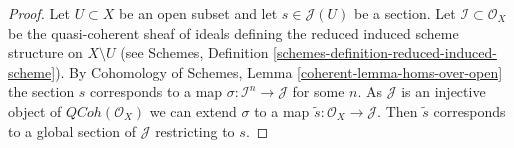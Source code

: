 \documentclass{stacks-project}
\theoremstyle{plain}
\theoremstyle{definition}
\theoremstyle{remark}
\numberwithin{equation}{subsection}
\def\QCoh{\mathit{QCoh}}
\begin{document}
\begin{proof}
Let $U \subset X$ be an open subset and let $s \in \mathcal{J}(U)$ be a section.
Let $\mathcal{I} \subset \mathcal{O}_X$ be the quasi-coherent sheaf
of ideals defining the reduced induced scheme structure on $X \setminus U$
(see Schemes, Definition \ref{schemes-definition-reduced-induced-scheme}).
By Cohomology of Schemes, Lemma \ref{coherent-lemma-homs-over-open}
the section $s$ corresponds to a map $\sigma : \mathcal{I}^n \to \mathcal{J}$
for some $n$. As $\mathcal{J}$ is an injective object of
$\QCoh(\mathcal{O}_X)$ we can extend $\sigma$ to a map
$\tilde s : \mathcal{O}_X \to \mathcal{J}$. Then $\tilde s$ corresponds
to a global section of $\mathcal{J}$ restricting to $s$.
\end{proof}
\end{document}
